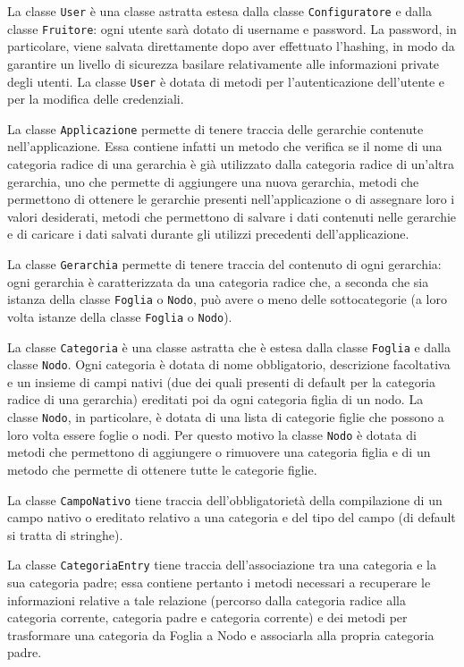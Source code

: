 La classe \texttt{User} è una classe astratta estesa dalla classe \texttt{Configuratore} e dalla classe \texttt{Fruitore}: ogni utente sarà dotato di username e password. La password, in particolare, viene salvata direttamente dopo aver effettuato l'hashing, in modo da garantire un livello di sicurezza basilare relativamente alle informazioni private degli utenti. La classe \texttt{User} è dotata di metodi per l'autenticazione dell'utente e per la modifica delle credenziali.

La classe \texttt{Applicazione} permette di tenere traccia delle gerarchie contenute nell'applicazione. 
Essa contiene infatti un metodo che verifica se il nome di una categoria radice di una gerarchia è già utilizzato dalla categoria radice di un'altra gerarchia, uno che permette di aggiungere una nuova gerarchia, metodi che permettono di ottenere le gerarchie presenti nell'applicazione o di assegnare loro i valori desiderati, metodi che permettono di salvare i dati contenuti nelle gerarchie e di caricare i dati salvati durante gli utilizzi precedenti dell'applicazione.

La classe \texttt{Gerarchia} permette di tenere traccia del contenuto di ogni gerarchia: ogni gerarchia è caratterizzata da una categoria radice che, a seconda che sia istanza della classe \texttt{Foglia} o \texttt{Nodo}, può avere o meno delle sottocategorie (a loro volta istanze della classe \texttt{Foglia} o \texttt{Nodo}). 

La classe \texttt{Categoria} è una classe astratta che è estesa dalla classe \texttt{Foglia} e dalla classe \texttt{Nodo}. Ogni categoria è dotata di nome obbligatorio, descrizione facoltativa e un insieme di campi nativi (due dei quali presenti di default per la categoria radice di una gerarchia) ereditati poi da ogni categoria figlia di un nodo.
La classe \texttt{Nodo}, in particolare, è dotata di una lista di categorie figlie che possono a loro volta essere foglie o nodi. Per questo motivo la classe \texttt{Nodo} è dotata di metodi che permettono di aggiungere o rimuovere una categoria figlia e di un metodo che permette di ottenere tutte le categorie figlie.

La classe \texttt{CampoNativo} tiene traccia dell'obbligatorietà della compilazione di un campo nativo o ereditato relativo a una categoria e del tipo del campo (di default si tratta di stringhe). 

La classe \texttt{CategoriaEntry} tiene traccia dell'associazione tra una categoria e la sua categoria padre; essa contiene pertanto i metodi necessari a recuperare le informazioni relative a tale relazione (percorso dalla categoria radice alla categoria corrente, categoria padre e categoria corrente) e dei metodi per trasformare una categoria da Foglia a Nodo e associarla alla propria categoria padre.

